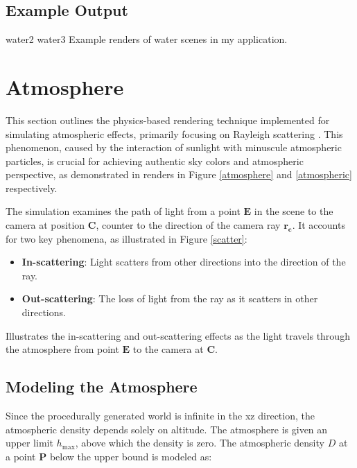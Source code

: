 \subsection{Example Output}

{}
{water2}{}
{water3}{}
{Example renders of water scenes in my application.}

\section{Atmosphere}
\label{Atmosphere}

This section outlines the physics-based rendering technique implemented for simulating atmospheric effects, primarily focusing on Rayleigh scattering \cite{young_rayleigh_1981}. This phenomenon, caused by the interaction of sunlight with minuscule atmospheric particles, is crucial for achieving authentic sky colors and atmospheric perspective, as demonstrated in renders in Figure \ref{atmosphere}  and \ref{atmospheric} respectively.

The simulation examines the path of light from a point $\mathbf{E}$ in the scene to the camera at position $\mathbf{C}$, counter to the direction of the camera ray $\mathbf{r_c}$. It accounts for two key phenomena, as illustrated in Figure \ref{scatter}:
\begin{itemize}
    \item \textbf{In-scattering}: Light scatters from other directions into the direction of the ray.
    \item \textbf{Out-scattering}: The loss of light from the ray as it scatters in other directions.
\end{itemize}

{Illustrates the in-scattering and out-scattering effects as the light travels through the atmosphere from point $\mathbf{E}$ to the camera at $\mathbf{C}$.}


\subsection{Modeling the Atmosphere}

Since the procedurally generated world is infinite in the xz direction, the atmospheric density depends solely on altitude. The atmosphere is given an upper limit $h_{\text{max}}$, above which the density is zero. The atmospheric density $D$ at a point $\mathbf{P}$ below the upper bound is modeled as:

